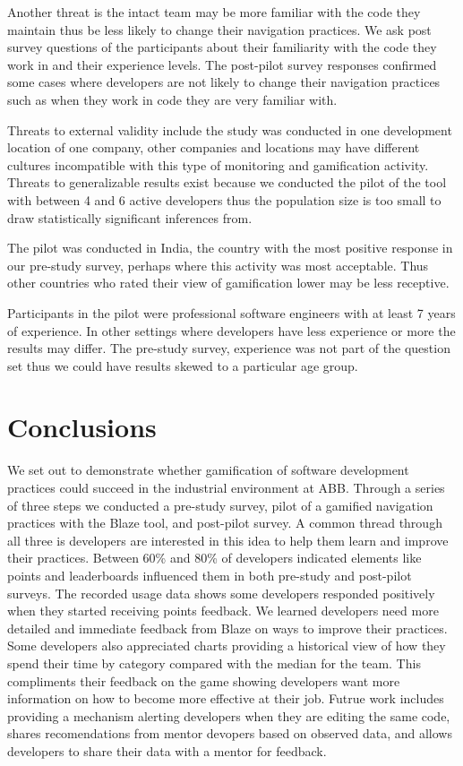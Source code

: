 \documentclass{sig-alternate}
\begin{document}
Another threat is the intact team may be more familiar with the code they maintain thus be less likely to change their navigation practices.  We ask post survey questions of the participants about their familiarity with the code they work in and their experience levels.   The post-pilot survey responses confirmed some cases where developers are not likely to change their navigation practices such as when they work in code they are very familiar with.  

Threats to external validity include the study was conducted in one development location of one company, other companies and locations may have different cultures incompatible with this type of monitoring and gamification activity.
 Threats to generalizable results exist because we conducted the pilot of the tool with between 4 and 6 active developers thus the population size is too small to draw statistically significant inferences from. 

 The pilot was conducted in India, the country with the most positive response in our pre-study survey, perhaps where this activity was most acceptable.  Thus other countries who rated their view of gamification lower may be less receptive. 

Participants in the pilot were professional software engineers with at least 7 years of experience.  In other settings where developers have less experience or more the results may differ.  The pre-study survey, experience was not part of the question set thus we could have results skewed to a particular age group.

\section{Conclusions}
We set out to demonstrate whether gamification of software development practices could succeed in the industrial environment at ABB.  Through a series of three steps we conducted a pre-study survey, pilot of a gamified navigation practices with the Blaze tool, and post-pilot survey.  A common thread through all three is developers are interested in this idea to help them learn and improve their practices.  Between 60\% and 80\% of developers indicated elements like points and leaderboards influenced them in both pre-study and post-pilot surveys.  The recorded usage data shows some developers responded positively when they started receiving points feedback.  We learned developers need more detailed and immediate feedback from Blaze on ways to improve their practices.  Some developers also appreciated charts providing a historical view of how they spend their time by category compared with the median for the team.  This compliments their feedback on the game showing developers want more information on how to become more effective at their job.  Futrue work includes providing a mechanism alerting developers when they are editing the same code, shares recomendations from mentor devopers based on observed data, and allows developers to share their data with a mentor for feedback.
\end{document}
